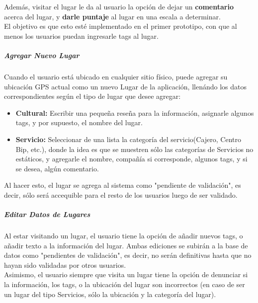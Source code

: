 \documentclass[10pt,letterpaper]{article}
\begin{document}
Además, visitar el lugar le da al usuario la opción de dejar un \textbf{comentario} acerca del lugar, y \textbf{darle puntaje} al lugar en una escala a determinar.\\

El objetivo es que esto esté implementado en el primer prototipo, con que al menos los usuarios puedan ingresarle tags al lugar.\\

\subparagraph{Agregar Nuevo Lugar}

Cuando el usuario está ubicado en cualquier sitio físico, puede agregar su ubicación GPS actual como un nuevo Lugar de la aplicación, llenándo los datos correspondientes según el tipo de lugar que desee agregar:\\

\begin{itemize}
 \item \textbf{Cultural:} Escribir una pequeña reseña para la información, asignarle algunos tags, y por supuesto, el nombre del lugar.\\

 \item \textbf{Servicio:} Seleccionar de una lista la categoría del servicio(Cajero, Centro Bip, etc.), donde la idea es que se muestren sólo las categorías de Servicios no estáticos, y agregarle el nombre, compañía si corresponde, algunos tags, y si se desea, algún comentario.\\
\end{itemize}

Al hacer esto, el lugar se agrega al sistema como "pendiente de validación", es decir, sólo será accequible para el resto de los usuarios luego de ser validado.\\

\subparagraph{Editar Datos de Lugares}

Al estar visitando un lugar, el usuario tiene la opción de añadir nuevos tags, o añadir texto a la información del lugar. Ambas ediciones se subirán a la base de datos como "pendientes de validación", es decir, no serán definitivas hasta que no hayan sido validadas por otros usuarios.\\

Asimismo, el usuario siempre que visita un lugar tiene la opción de denunciar si la información, los tags, o la ubicación del lugar son incorrectos (en caso de ser un lugar del tipo Servicios, sólo la ubicación y la categoría del lugar).\\
\end{document}
